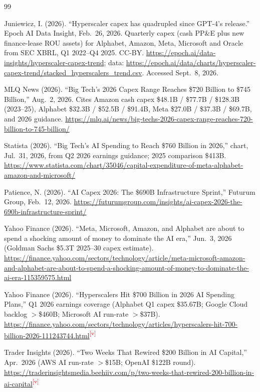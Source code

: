 \documentclass[11pt,letterpaper]{article}
\newcommand{\verify}{\textsuperscript{\textcolor{red}{[v]}}}
\begin{document}
\newpage
\begin{thebibliography}{99}

Juniewicz, I. (2026). ``Hyperscaler capex has quadrupled since GPT-4's release.'' Epoch AI Data Insight, Feb.~26, 2026. Quarterly capex (cash PP\&E plus new finance-lease ROU assets) for Alphabet, Amazon, Meta, Microsoft and Oracle from SEC XBRL, Q1 2022--Q4 2025. CC-BY. \url{https://epoch.ai/data-insights/hyperscaler-capex-trend}; data: \url{https://epoch.ai/data/charts/hyperscaler-capex-trend/stacked_hyperscalers_trend.csv}. Accessed Sept.~8, 2026.

MLQ News (2026). ``Big Tech's 2026 Capex Range Reaches \$720 Billion to \$745 Billion,'' Aug.~2, 2026. Cites Amazon cash capex \$48.1B / \$77.7B / \$128.3B (2023--25), Alphabet \$32.3B / \$52.5B / \$91.4B, Meta \$27.0B / \$37.3B / \$69.7B, and 2026 guidance. \url{https://mlq.ai/news/big-techs-2026-capex-range-reaches-720-billion-to-745-billion/}

Statista (2026). ``Big Tech's AI Spending to Reach \$760 Billion in 2026,'' chart, Jul.~31, 2026, from Q2 2026 earnings guidance; 2025 comparison \$413B. \url{https://www.statista.com/chart/35046/capital-expenditure-of-meta-alphabet-amazon-and-microsoft/}

Patience, N. (2026). ``AI Capex 2026: The \$690B Infrastructure Sprint,'' Futurum Group, Feb.~12, 2026. \url{https://futurumgroup.com/insights/ai-capex-2026-the-690b-infrastructure-sprint/}

Yahoo Finance (2026). ``Meta, Microsoft, Amazon, and Alphabet are about to spend a shocking amount of money to dominate the AI era,'' Jun.~3, 2026 (Goldman Sachs \$5.3T 2025--30 capex estimate). \url{https://finance.yahoo.com/sectors/technology/article/meta-microsoft-amazon-and-alphabet-are-about-to-spend-a-shocking-amount-of-money-to-dominate-the-ai-era-115359575.html}

Yahoo Finance (2026). ``Hyperscalers Hit \$700 Billion in 2026 AI Spending Plans,'' Q1 2026 earnings coverage (Alphabet Q1 capex \$35.67B; Google Cloud backlog $>$\$460B; Microsoft AI run-rate $>$\$37B). \url{https://finance.yahoo.com/sectors/technology/articles/hyperscalers-hit-700-billion-2026-111243744.html}\verify

Trader Insights (2026). ``Two Weeks That Rewired \$200 Billion in AI Capital,'' Apr.~2026 (AWS AI run-rate $>$\$15B; OpenAI \$122B round). \url{https://traderinsightsmedia.beehiiv.com/p/two-weeks-that-rewired-200-billion-in-ai-capital}\verify


\end{thebibliography}
\end{document}
